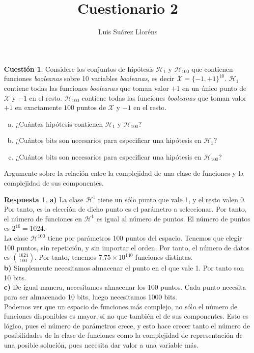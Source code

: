 \documentclass[10pt,a4paper]{article}
\author{Luis Suárez Lloréns}
\title{Cuestionario 2}
\date{}
\theoremstyle{definition}
\newtheorem{cuestion}{Cuestión}
\newtheorem*{respuesta}{Respuesta}
\begin{document}
\maketitle

\begin{cuestion}
Considere los conjuntos de hipótesis $\mathcal{H}_1$ y $\mathcal{H}_{100}$ que contienen funciones \textit{booleanas} sobre 10 variables \textit{booleanas}, es decir $\mathcal{X} = \{-1, +1\}^{10}$. $\mathcal{H}_1$ contiene todas las funciones \textit{booleanas} que toman valor $+1$ en un único punto de $\mathcal{X}$ y $-1$ en el resto. $\mathcal{H}_{100}$ contiene todas las funciones \textit{booleanas} que toman valor $+1$ en exactamente $100$ puntos de $\mathcal{X}$ y $-1$ en el resto.
\begin{enumerate}[a)]
\item ¿Cuántas hipótesis contienen $\mathcal{H}_1$ y $\mathcal{H}_{100}$?
\item ¿Cuántos bits son necesarios para especificar una hipótesis en $\mathcal{H}_1$?
\item ¿Cuántos bits son necesarios para especificar una hipótesis en $\mathcal{H}_{100}$?
\end{enumerate}

Argumente sobre la relación entre la complejidad de una clase de funciones y la complejidad de sus componentes.\\

\end{cuestion}
\begin{respuesta}
\textbf{a)}
La clase $\mathcal{H}^1$ tiene un sólo punto que vale 1, y el resto valen 0. Por tanto, es la elección de dicho punto es el parámetro a seleccionar. Por tanto, el número de funciones en $\mathcal{H}^1$ es igual al número de puntos. El número de puntos es $2^{10} = 1024$.\\

La clase $\mathcal{H}^{100}$ tiene por parámetros 100 puntos del espacio. Tenemos que elegir 100 puntos, sin repetición, y sin importar el orden. Por tanto, el número de datos es $\binom{1024}{100}$. Por tanto, tenemos $7.75 \times 10^{140} $ funciones distintas.\\

\textbf{b)}
Simplemente necesitamos almacenar el punto en el que vale 1. Por tanto son 10 bits.\\

\textbf{c)}
De igual manera, necesitamos almacenar los 100 puntos. Cada punto necesita para ser almacenado 10 bits, luego necesitamos 1000 bits.\\

Podemos ver que un espacio de funciones más complejo, no sólo el número de funciones disponibles es mayor, si no que también el de sus componentes. Esto es lógico, pues el número de parámetros crece, y esto hace crecer tanto el número de posibilidades de la clase de funciones como la complejidad de representación de una posible solución, pues necesita dar valor a una variable más.\\
\end{respuesta}
\end{document}
